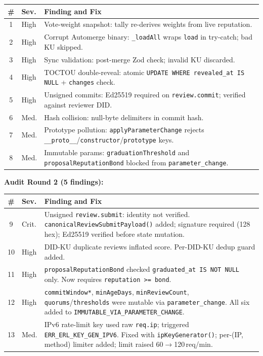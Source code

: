 \documentclass[10pt,twocolumn]{article}
\begin{document}
\begin{center}
\small
\setlength{\tabcolsep}{4pt}
\begin{tabular}{clp{5.5cm}}
\toprule
\textbf{\#} & \textbf{Sev.} & \textbf{Finding and Fix} \\
\midrule
1 & High & Vote-weight snapshot: tally re-derives weights from live reputation. \\
2 & High & Corrupt Automerge binary: \texttt{\_loadAll} wraps \texttt{load}
           in try-catch; bad KU skipped. \\
3 & High & Sync validation: post-merge Zod check; invalid KU discarded. \\
4 & High & TOCTOU double-reveal: atomic
           \texttt{UPDATE WHERE revealed\_at IS NULL} + \texttt{changes} check. \\
5 & High & Unsigned commits: Ed25519 required on \texttt{review.commit};
           verified against reviewer DID. \\
6 & Med. & Hash collision: null-byte delimiters in commit hash. \\
7 & Med. & Prototype pollution: \texttt{applyParameterChange} rejects
           \texttt{\_\_proto\_\_}/\texttt{constructor}/\texttt{prototype} keys. \\
8 & Med. & Immutable params: \texttt{graduationThreshold} and
           \texttt{proposalReputationBond} blocked from \texttt{parameter\_change}. \\
\bottomrule
\end{tabular}
\end{center}

\textbf{Audit Round 2 (5 findings):}

\begin{center}
\small
\setlength{\tabcolsep}{4pt}
\begin{tabular}{clp{5.5cm}}
\toprule
\textbf{\#} & \textbf{Sev.} & \textbf{Finding and Fix} \\
\midrule
9  & Crit. & Unsigned \texttt{review.submit}: identity not verified.
             \texttt{canonicalReview\-SubmitPayload()} added; signature
             required (128 hex); Ed25519 verified before state mutation. \\
10 & High  & DID-KU duplicate reviews inflated score.
             Per-DID-KU dedup guard added. \\
11 & High  & \texttt{proposalReputation\-Bond} checked
             \texttt{graduated\_at IS NOT NULL} only.
             Now requires \texttt{reputation >= bond}. \\
12 & High  & \texttt{commitWindow*}, \texttt{minAgeDays},
             \texttt{minReviewCount}, \texttt{quorums}/\texttt{thresholds}
             were mutable via \texttt{parameter\_change}.
             All six added to \texttt{IMMUTABLE\_VIA\_\-PARAMETER\_CHANGE}. \\
13 & Med.  & IPv6 rate-limit key used raw \texttt{req.ip}; triggered
             \texttt{ERR\_ERL\_KEY\_GEN\_IPV6}. Fixed with
             \texttt{ipKey\-Generator()}; per-(IP,\,method) limiter added;
             limit raised 60$\to$120\,req/min. \\
\bottomrule
\end{tabular}
\end{center}
\end{document}
